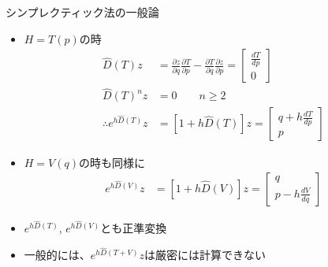 \begin{frame}[t,fragile]{シンプレクティック法の一般論}
  \begin{itemize}
  \item $H=T(p)$の時
    \begin{align*}
      \hat{D}(T)z &= \frac{\partial z}{\partial q} \frac{\partial T}{\partial p} - \frac{\partial T}{\partial q} \frac{\partial z}{\partial p} = \begin{bmatrix} \frac{dT}{dp} \\ 0 \end{bmatrix} \\
      \hat{D}(T)^n z &= 0 \qquad n \ge 2 \\
      \therefore e^{h\hat{D}(T)} z &= [ 1+h\hat{D}(T) ] z = \begin{bmatrix} q + h \frac{dT}{dp} \\ p \end{bmatrix}
    \end{align*}
  \item $H=V(q)$の時も同様に
    \begin{align*}
      e^{h\hat{D}(V)} z &= [ 1+h\hat{D}(V) ] z = \begin{bmatrix} q \\ p - h \frac{dV}{dq} \end{bmatrix}
    \end{align*}
  \item $e^{h\hat{D}(T)}$, $e^{h\hat{D}(V)}$とも正準変換
  \item 一般的には、$e^{h\hat{D}(T+V)} z$は厳密には計算できない
  \end{itemize}
\end{frame}
